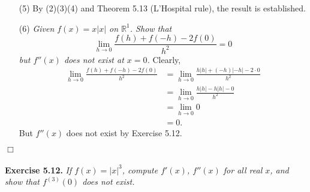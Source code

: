 \documentclass{article}
\begin{document}
\begin{enumerate}
  \item[(5)]
  By (2)(3)(4) and Theorem 5.13 (L'Hospital rule),
  the result is established.

  \item[(6)]
  \emph{Given $f(x) = x|x|$ on $\mathbb{R}^1$.
  Show that
  \[
    \lim_{h \to 0}{\frac{f(h) + f(-h) - 2f(0)}{h^2}} = 0
  \]
  but $f''(x)$ does not exist at $x = 0$.}
  Clearly,
  \begin{align*}
    \lim_{h \to 0}{\frac{f(h) + f(-h) - 2f(0)}{h^2}}
    &= \lim_{h \to 0}{\frac{h|h| + (-h)|-h| - 2 \cdot 0}{h^2}} \\
    &= \lim_{h \to 0}{\frac{h|h| - h|h| - 0}{h^2}} \\
    &= \lim_{h \to 0}{0} \\
    &= 0.
  \end{align*}
  But $f''(x)$ does not exist by Exercise 5.12.
\end{enumerate}
$\Box$ \\\\






\textbf{Exercise 5.12.}
\emph{If $f(x) = |x|^3$, compute $f'(x)$, $f''(x)$ for all real $x$,
and show that $f^{(3)} (0)$ does not exist.} \\
\end{document}
